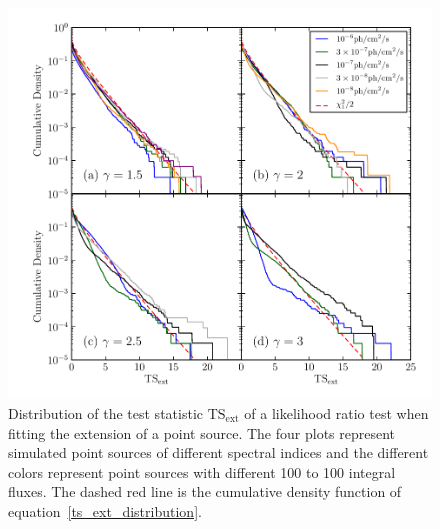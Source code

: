 \documentclass[12pt,preprint]{aastex}
\newcommand{\mev}{\text{MeV}\xspace}
\newcommand{\gev}{\text{GeV}\xspace}
\newcommand{\tsext}{{\ensuremath{\text{TS}_{\text{ext}}}}\xspace}
\begin{document}
\clearpage

\clearpage
\begin{figure}
  \begin{center}
    \includegraphics{mc_plots/ts_ext_emin_1000.pdf}
    \end{center}
    \caption{
    Distribution of the test statistic \tsext of a likelihood ratio
    test when fitting the extension of a point source.  The four plots
    represent simulated point sources of different spectral indices and
    the different colors represent point sources with different 100 \mev
    to 100 \gev integral fluxes.  The dashed red line is the cumulative
    density function of equation~\ref{ts_ext_distribution}.
    }\label{ts_ext_mc}
  \end{figure}

\clearpage
\end{document}
